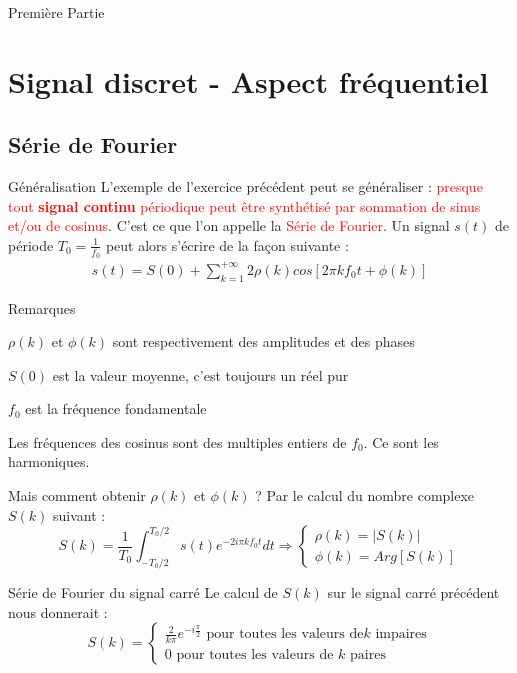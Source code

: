 \documentclass{beamer}
\begin{document}
\begin{frame}{Première Partie}
	\tableofcontents 
\end{frame}

\section{Signal discret - Aspect fréquentiel}
\subsection{Série de Fourier} 
\begin{frame}
\begin{block}{Généralisation}
\justifying L'exemple de l'exercice précédent peut se généraliser  :
\textcolor{red}{presque tout \textbf{signal continu} périodique peut être
synthétisé par sommation de sinus et/ou de cosinus}. C'est ce que l'on appelle la \textcolor{red}{Série de Fourier}. Un signal $s(t)$ de
période $T_0 = \frac{1}{f_0}$ peut alors s'écrire de la façon suivante :
\begin{align*}
s(t) = S(0) + \sum_{k=1}^{+\infty} 2\rho (k) cos[2\pi kf_0t+\phi (k)]
\end{align*}
\end{block}
\pause
\begin{alertblock}{Remarques}
	\itemize
	\item $\rho(k)$ et $\phi(k)$ sont respectivement des amplitudes et des phases
	\pause
	\item $S(0)$ est la valeur moyenne, c'est toujours un réel pur
	\pause
	\item $f_0$ est la fréquence fondamentale 
	\pause
	\item Les fréquences des cosinus sont des multiples entiers de $f_0$. Ce sont
	les harmoniques.
\end{alertblock}
\end{frame}

\begin{frame}
\begin{alertblock}{Mais comment obtenir $\rho(k)$ et $\phi(k)$ ?}
\justifying Par le calcul du nombre complexe $S(k)$ suivant :
\[
S(k) = \frac{1}{T_0}\int_{-T_{0}/2}^{T_{0}/2}s(t)e^{-2i\pi k f_{0}t} dt
\Rightarrow
\begin{cases}
\rho(k) = \lvert S(k) \rvert\\
\phi(k) = Arg[S(k)]
\end{cases}
\]
\end{alertblock}
\pause
\begin{block}{Série de Fourier du signal carré}
\justifying Le calcul de $S(k)$ sur le signal carré précédent nous donnerait :
\[
S(k) =
\begin{cases}
 \frac{2}{k\pi}e^{-i\frac{\pi}{2}}\text{ pour toutes les valeurs de
}k\text{ impaires}\\
0\text{ pour toutes les valeurs de }k\text{ paires}
\end{cases}
\]
\end{block}
\end{frame} 
\end{document}
